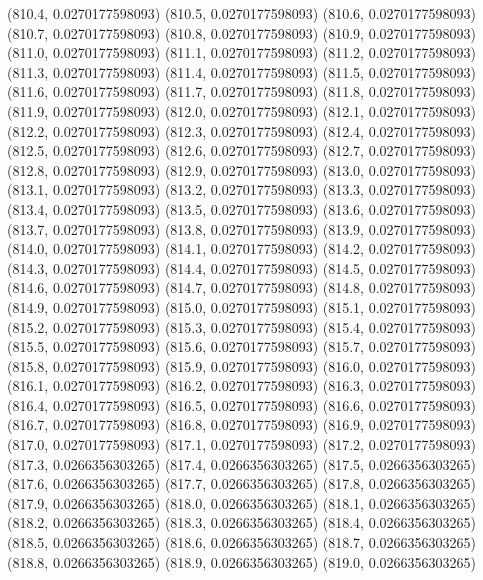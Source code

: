 {					(810.4, 0.0270177598093)
					(810.5, 0.0270177598093)
					(810.6, 0.0270177598093)
					(810.7, 0.0270177598093)
					(810.8, 0.0270177598093)
					(810.9, 0.0270177598093)
					(811.0, 0.0270177598093)
					(811.1, 0.0270177598093)
					(811.2, 0.0270177598093)
					(811.3, 0.0270177598093)
					(811.4, 0.0270177598093)
					(811.5, 0.0270177598093)
					(811.6, 0.0270177598093)
					(811.7, 0.0270177598093)
					(811.8, 0.0270177598093)
					(811.9, 0.0270177598093)
					(812.0, 0.0270177598093)
					(812.1, 0.0270177598093)
					(812.2, 0.0270177598093)
					(812.3, 0.0270177598093)
					(812.4, 0.0270177598093)
					(812.5, 0.0270177598093)
					(812.6, 0.0270177598093)
					(812.7, 0.0270177598093)
					(812.8, 0.0270177598093)
					(812.9, 0.0270177598093)
					(813.0, 0.0270177598093)
					(813.1, 0.0270177598093)
					(813.2, 0.0270177598093)
					(813.3, 0.0270177598093)
					(813.4, 0.0270177598093)
					(813.5, 0.0270177598093)
					(813.6, 0.0270177598093)
					(813.7, 0.0270177598093)
					(813.8, 0.0270177598093)
					(813.9, 0.0270177598093)
					(814.0, 0.0270177598093)
					(814.1, 0.0270177598093)
					(814.2, 0.0270177598093)
					(814.3, 0.0270177598093)
					(814.4, 0.0270177598093)
					(814.5, 0.0270177598093)
					(814.6, 0.0270177598093)
					(814.7, 0.0270177598093)
					(814.8, 0.0270177598093)
					(814.9, 0.0270177598093)
					(815.0, 0.0270177598093)
					(815.1, 0.0270177598093)
					(815.2, 0.0270177598093)
					(815.3, 0.0270177598093)
					(815.4, 0.0270177598093)
					(815.5, 0.0270177598093)
					(815.6, 0.0270177598093)
					(815.7, 0.0270177598093)
					(815.8, 0.0270177598093)
					(815.9, 0.0270177598093)
					(816.0, 0.0270177598093)
					(816.1, 0.0270177598093)
					(816.2, 0.0270177598093)
					(816.3, 0.0270177598093)
					(816.4, 0.0270177598093)
					(816.5, 0.0270177598093)
					(816.6, 0.0270177598093)
					(816.7, 0.0270177598093)
					(816.8, 0.0270177598093)
					(816.9, 0.0270177598093)
					(817.0, 0.0270177598093)
					(817.1, 0.0270177598093)
					(817.2, 0.0270177598093)
					(817.3, 0.0266356303265)
					(817.4, 0.0266356303265)
					(817.5, 0.0266356303265)
					(817.6, 0.0266356303265)
					(817.7, 0.0266356303265)
					(817.8, 0.0266356303265)
					(817.9, 0.0266356303265)
					(818.0, 0.0266356303265)
					(818.1, 0.0266356303265)
					(818.2, 0.0266356303265)
					(818.3, 0.0266356303265)
					(818.4, 0.0266356303265)
					(818.5, 0.0266356303265)
					(818.6, 0.0266356303265)
					(818.7, 0.0266356303265)
					(818.8, 0.0266356303265)
					(818.9, 0.0266356303265)
					(819.0, 0.0266356303265)
}
